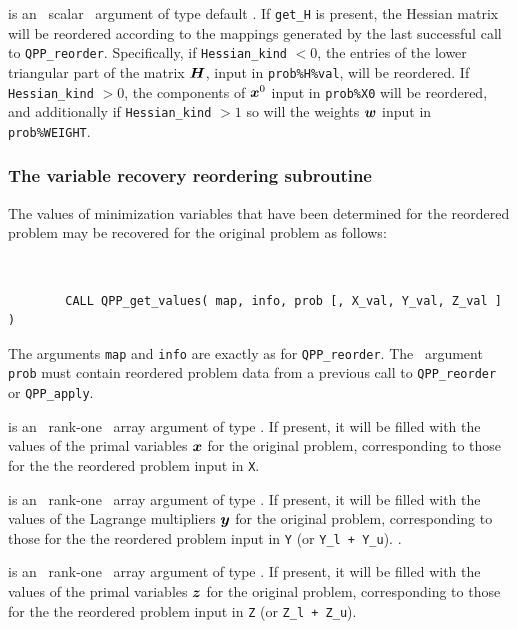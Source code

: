 \documentclass{galahad}
\newcommand{\packagename}{QPP}
\begin{document}
\begin{description}
is an \optional\ scalar \intentin\ argument of type default \logical. 
If {\tt get\_H} is present, the Hessian matrix will be reordered according to the
mappings generated by the last successful call to {\tt \packagename\_reorder}. 
Specifically, if {\tt Hessian\_kind} $< 0$, the entries of the 
lower triangular part of the matrix ${\bm{H}}$, input in {\tt prob\%H\%val}, 
will be reordered. If {\tt Hessian\_kind} $> 0$, the 
components of ${\bm{x}}^0$ input in {\tt prob\%X0} will be reordered, 
and additionally if {\tt Hessian\_kind} $> 1$ so will the weights 
${\bm{w}}$ input in {\tt prob\%WEIGHT}.

\end{description}


\subsubsection{The  variable recovery reordering subroutine}
The values of minimization variables that have been determined for the 
reordered problem may be recovered for the original problem as follows: 
\vspace*{-2mm}
{\tt 
\begin{verbatim}
        CALL QPP_get_values( map, info, prob [, X_val, Y_val, Z_val ] )
\end{verbatim}
}
\vspace*{-1mm}
\noindent
The arguments {\tt map} and {\tt info} are exactly as for 
{\tt \packagename\_reorder}. 
The \intentin\ argument {\tt prob}
must contain reordered problem data from a previous call 
to {\tt QPP\_reorder} or {\tt QPP\_apply}.

\begin{description}
 is an \optional\ rank-one \intentout\ array argument of 
type \realdp. If 
present, it will be filled with the values of the primal variables ${\bm{x}}$ 
for the original problem, corresponding to those for the the reordered 
problem input in {\tt X}. 
 
 is an \optional\ rank-one \intentout\ array argument of 
type \realdp. If present, 
it will be filled with the values of the Lagrange multipliers ${\bm{y}}$ 
for the original problem, corresponding to those for the the reordered 
problem input in {\tt Y} (or {\tt Y\_l + Y\_u}).
. 
 
 is an \optional\ rank-one \intentout\ array argument of 
type \realdp. If 
present, it will be filled with the values of the primal variables ${\bm{z}}$ 
for the original problem, corresponding to those for the the reordered 
problem input in {\tt Z} (or {\tt Z\_l + Z\_u}).
\end{description}
\end{document}
